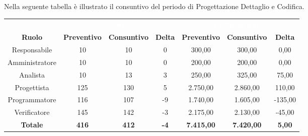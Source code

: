 Nella seguente tabella è illustrato il consuntivo del periodo di Progettazione Dettaglio e Codifica.

\begin{tabular}{c|ccc|ccc}
\rowcolor{greySWEight}
\multicolumn{1}{c}{} & \multicolumn{3}{c}{\textcolor{white}{\textbf{Ore}}} & \multicolumn{3}{c}{\textcolor{white}{\textbf{Costo in Euro}}} \\
{\textbf{Ruolo}} & {\textbf{Preventivo}} & {\textbf{Consuntivo}} & {\textbf{Delta}} & {\textbf{Preventivo}} & {\textbf{Consuntivo}} & {\textbf{Delta}} \\
Responsabile & 10 & 10 & 0 & 300,00 & 300,00 & 0,00 \\
Amministratore & 10 & 10 & 0 & 200,00 & 200,00 & 0,00 \\
Analista & 10 & 13 & 3 & 250,00 & 325,00 & 75,00 \\
Progettista & 125 & 130 & 5 & 2.750,00 & 2.860,00 & 110,00 \\
Programmatore & 116 & 107 & -9 & 1.740,00 & 1.605,00 & -135,00 \\
Verificatore & 145 & 142 & -3 & 2.175,00 & 2.130,00 & -45,00 \\
\textbf{Totale} & \textbf{416} & \textbf{412} & \textbf{-4} & \textbf{7.415,00} & \textbf{7.420,00} & \textbf{5,00}\\

\end{tabular}